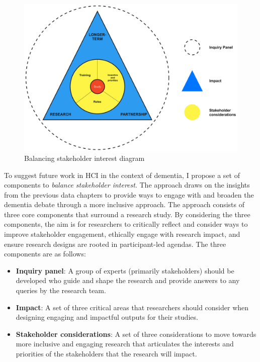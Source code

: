 \begin{figure}[htp]
\centering
\includegraphics[width=0.8\linewidth]{Images/Discussion/DesignApproach.jpg}
\caption{Balancing stakeholder interest diagram}
\label{fig:MeaningfulParticipation}
\end{figure}
To suggest future work in HCI in the context of dementia, I propose a set of components to \textit{balance stakeholder interest}. The approach draws on the insights from the previous data chapters to provide ways to engage with and broaden the dementia debate through a more inclusive approach. The approach consists of three core components that surround a research study. By considering the three components, the aim is for researchers to critically reflect and consider ways to improve stakeholder engagement, ethically engage with research impact, and ensure research designs are rooted in participant-led agendas. The three components are as follows:

\begin{itemize}
    \item \textbf{Inquiry panel}: A group of experts (primarily stakeholders) should be developed who guide and shape the research and provide answers to any queries by the research team.
    \item \textbf{Impact}: A set of three critical areas that researchers should consider when designing engaging and impactful outputs for their studies.
    \item \textbf{Stakeholder considerations}: A set of three considerations to move towards more inclusive and engaging research that articulates the interests and priorities of the stakeholders that the research will impact.
\end{itemize}

